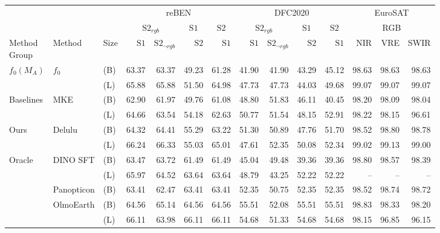 \bigskip

\begin{tabular}{lll | r r r r | r r r r | r r r}
\toprule
  \multicolumn{3}{c}{} & \multicolumn{4}{c|}{reBEN} & \multicolumn{4}{c|}{DFC2020} & \multicolumn{3}{c}{EuroSAT} \\
  \multicolumn{3}{c}{} & \multicolumn{2}{c}{$\mathrm{S2}_{rgb}$} & \multicolumn{1}{c}{$\mathrm{S1}$} & \multicolumn{1}{c|}{$\mathrm{S2}$} & \multicolumn{2}{c}{$\mathrm{S2}_{rgb}$} & \multicolumn{1}{c}{$\mathrm{S1}$} & \multicolumn{1}{c|}{$\mathrm{S2}$} & \multicolumn{3}{c}{RGB} \\
  \shortstack[c]{Method\\Group} & Method & Size & $\mathrm{S1}$ & $\mathrm{S2}_{\neg rgb}$ & $\mathrm{S2}$ & $\mathrm{S1}$ & $\mathrm{S1}$ & $\mathrm{S2}_{\neg rgb}$ & $\mathrm{S2}$ & $\mathrm{S1}$ & NIR & VRE & SWIR \\
  \midrule
  \multirow{2}{*}{$f_0(M_A)$} & \multirow{2}{*}{$f_0$} & (B) & 63.37 & 63.37 & 49.23 & 61.28 & 41.90 & 41.90 & 43.29 & 45.12 & 98.63 & 98.63 & 98.63 \\
   &  & (L) & 65.88 & 65.88 & 51.50 & 64.98 & 47.73 & 47.73 & 44.03 & 49.68 & 99.07 & 99.07 & 99.07 \\
  \midrule
  \multirow{2}{*}{Baselines} & \multirow{2}{*}{MKE} & (B) & 62.90 & 61.97 & 49.76 & 61.08 & 48.80 & 51.83 & 46.11 & 40.45 & 98.20 & 98.09 & 98.04 \\
   &  & (L) & 64.66 & 63.54 & 54.18 & 62.63 & 50.77 & 51.54 & 48.15 & 52.91 & 98.22 & 98.15 & 96.61 \\
  \midrule
  \multirow{2}{*}{Ours} & \multirow{2}{*}{Delulu} & (B) & 64.32 & 64.41 & 55.29 & 63.22 & 51.30 & 50.89 & 47.76 & 51.70 & 98.52 & 98.80 & 98.78 \\
   &  & (L) & 66.24 & 66.33 & 55.03 & 65.01 & 47.61 & 52.35 & 50.08 & 52.34 & 99.02 & 99.13 & 99.00 \\
  \midrule
  \multirow{5}{*}{Oracle} & \multirow{2}{*}{DINO SFT} & (B) & 63.47 & 63.72 & 61.49 & 61.49 & 45.04 & 49.48 & 39.36 & 39.36 & 98.80 & 98.57 & 98.39 \\
   &  & (L) & 65.97 & 64.52 & 63.64 & 63.64 & 48.79 & 43.25 & 52.22 & 52.22 & -- & -- & -- \\
   & Panopticon & (B) & 63.41 & 62.47 & 63.41 & 63.41 & 52.35 & 50.75 & 52.35 & 52.35 & 98.52 & 98.74 & 98.72 \\
   & \multirow{2}{*}{OlmoEarth} & (B) & 64.56 & 65.14 & 64.56 & 64.56 & 55.51 & 52.08 & 55.51 & 55.51 & 98.83 & 98.33 & 98.20 \\
   &  & (L) & 66.11 & 63.98 & 66.11 & 66.11 & 54.68 & 51.33 & 54.68 & 54.68 & 98.15 & 96.85 & 96.15 \\
\bottomrule
\end{tabular}
